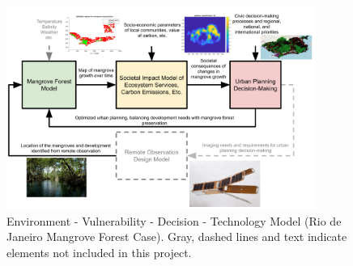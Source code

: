 

\begin{figure}[!htb]
\centering
\includegraphics[width=0.9\textwidth]{Figures/chap4/MangroveModelFlow.png}
\caption[EVDT Model (Rio de Janeiro Mangrove Forest Case)]{Environment - Vulnerability - Decision - Technology Model (Rio de Janeiro Mangrove Forest Case). Gray, dashed lines and text indicate elements not included in this project.}
\label{fig:rio-evdt-flow}
\end{figure}

